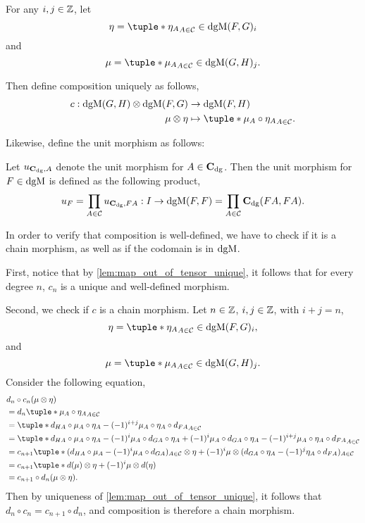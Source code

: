 \begin{remark}
    For any \( i, j \in {\mathbb{Z}} \), let
    \[
        \eta = \tuple*{\eta_A}_{A \in \Cc} \in \dgM(F, G)_i
    \]
    and
    \[
        \mu = \tuple*{\mu_A}_{A \in \Cc} \in \dgM(G, H)_j.
    \]

    Then define composition uniquely as follows,
    \begin{align*}
        c: \dgM(G, H) \otimes \dgM(F, G) &\to \dgM(F, H) \\
        \mu \otimes \eta &\mapsto \tuple*{\mu_A \circ \eta_A}_{A \in \Cc}.
    \end{align*}

    Likewise, define the unit morphism as follows:
    
    Let \( u_{\operatorname{\mathbf{C}}_{\operatorname{dg}}, A} \) denote the unit morphism for \( A \in \operatorname{\mathbf{C}}_{\operatorname{dg}} \). Then the unit morphism for \( F \in \operatorname{dgM} \) is defined as the following product,
    \[
        u_F = \prod_{A \in {\mathcal{C}}} u_{\operatorname{\mathbf{C}}_{\operatorname{dg}}, F A} : I \to \operatorname{dgM}(F, F) = \prod_{A \in {\mathcal{C}}} \operatorname{\mathbf{C}}_{\operatorname{dg}}(F A, F A).
    \]

    In order to verify that composition is well-defined, we have to check if it is a chain morphism, as well as if the codomain is in \( \operatorname{dgM} \).

    First, notice that by \autoref{lem:map_out_of_tensor_unique}, it follows that for every degree \( n \), \( c_n \) is a unique and well-defined morphism.

    Second, we check if \( c \) is a chain morphism. Let \( n \in {\mathbb{Z}} \), \( i, j \in {\mathbb{Z}} \), with \( i + j = n \),
    \[
        \eta = \tuple*{\eta_A}_{A \in \Cc} \in \dgM(F, G)_i,
    \]
    and
    \[
        \mu = \tuple*{\mu_A}_{A \in \Cc} \in \dgM(G, H)_j.
    \]
    Consider the following equation,
    \begin{align*}
        &d_n \circ c_n (\mu \otimes \eta) \\
        &= d_n \tuple*{\mu_A \circ \eta_A}_{A \in \Cc} \\
        &= \tuple*{d_{H A} \circ \mu_A \circ \eta_A - (-1)^{i + j} \mu_A \circ \eta_A \circ d_{F A}}_{A \in \Cc} \\
        &= \tuple*{d_{H A} \circ \mu_A \circ \eta_A - (-1)^i \mu_A \circ d_{G A} \circ \eta_A + (-1)^i \mu_A \circ d_{G A} \circ \eta_A - (-1)^{i + j} \mu_A \circ \eta_A \circ d_{F A}}_{A \in \Cc} \\
        &= c_{n + 1} \tuple*{ (d_{H A} \circ \mu_A - (-1)^i \mu_A \circ d_{G A})_{A \in \Cc} \otimes \eta + (-1)^i \mu \otimes (d_{G A} \circ \eta_A - (-1)^j \eta_A \circ d_{F A})_{A \in \Cc} } \\
        &= c_{n + 1} \tuple*{ d(\mu) \otimes \eta + (-1)^i \mu \otimes d(\eta) } \\
        &= c_{n + 1} \circ d_n (\mu \otimes \eta).
    \end{align*}
    Then by uniqueness of \autoref{lem:map_out_of_tensor_unique}, it follows that \( d_n \circ c_n = c_{n + 1} \circ d_n \), and composition is therefore a chain morphism.
    

\end{remark}
